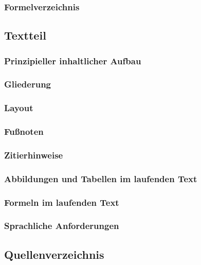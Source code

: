 \subsubsection{Formelverzeichnis}
\label{formal-gestaltung-aufbau-formel-verz}
\subsection{Textteil}
\label{formal-gestaltung-textteil}
\subsubsection{Prinzipieller inhaltlicher Aufbau}
\label{formal-gestaltung-textteil-prinzipiell}
\subsubsection{Gliederung}
\label{formal-gestaltung-textteil-gliederung}
\subsubsection{Layout}
\label{formal-gestaltung-textteil-layout}
\subsubsection{Fußnoten}
\label{formal-gestaltung-textteil-fn}
\subsubsection{Zitierhinweise}
\label{formal-gestaltung-textteil-zitierhinweise}
\subsubsection{Abbildungen und Tabellen im laufenden Text}
\label{formal-gestaltung-textteil-fig-tab-fliesstext}
\subsubsection{Formeln im laufenden Text}
\label{formal-gestaltung-textteil-formeln-fliesstext}
\subsubsection{Sprachliche Anforderungen}
\label{formal-gestaltung-textteil-sprache}
\subsection{Quellenverzeichnis}
\label{formal-gestaltung-quellenverzeichnis}
